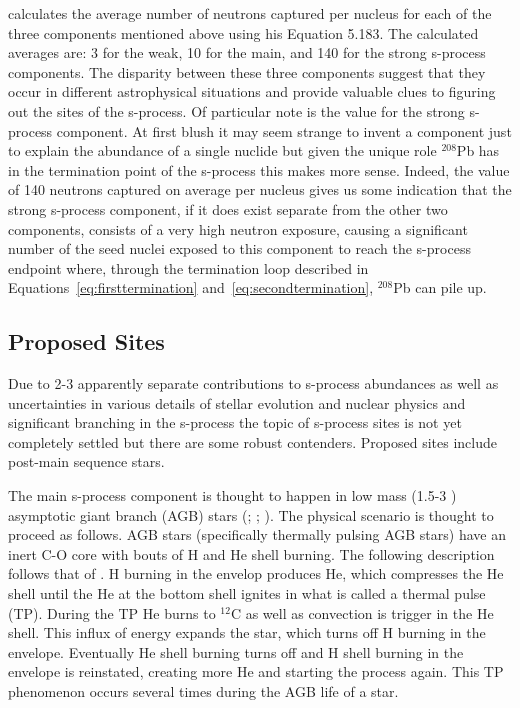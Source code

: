 \cite{iliadis2008} calculates the average number of neutrons captured
per nucleus for each of the three components mentioned above using his
Equation 5.183.  The calculated averages are: 3 for the weak, 10 for
the main, and 140 for the strong s-process components.  The disparity
between these three components suggest that they occur in different
astrophysical situations and provide valuable clues to figuring out
the sites of the s-process.  Of particular note is the value for the
strong s-process component.  At first blush it may seem strange to
invent a component just to explain the abundance of a single nuclide
but given the unique role $^{208}$Pb has in the termination point of
the s-process this makes more sense.  Indeed, the value of 140
neutrons captured on average per nucleus gives us some indication that
the strong s-process component, if it does exist separate from the
other two components, consists of a very high neutron exposure,
causing a significant number of the seed nuclei exposed to this
component to reach the s-process endpoint where, through the
termination loop described in Equations~\ref{eq:firsttermination}
and~\ref{eq:secondtermination}, $^{208}$Pb can pile up.

\subsection{Proposed Sites}

Due to 2-3 apparently separate contributions to s-process abundances
as well as uncertainties in various details of stellar evolution and
nuclear physics and significant branching in the s-process 
the topic of s-process sites is not yet completely
settled but there are some robust contenders.  Proposed
sites include post-main sequence stars.  

The main s-process component is thought to happen in low mass
(1.5-3 \Msol) asymptotic giant branch (AGB) stars
(\citealt{schwarzschild1967}; \citealt{bussoetal1999}; 
\citealt{arlandinietal1999}).
The physical scenario is thought to proceed as follows.  AGB stars
(specifically thermally pulsing AGB stars)
have an inert C-O core with bouts of H and He shell burning.  The
following description follows that of \cite{kappeleretal2011}.  H
burning in the envelop produces He, which compresses the He shell
until the He at the bottom shell ignites in what is called a thermal
pulse (TP).  During the TP He burns to $^{12}$C as well as convection
is trigger in the He shell.  This influx of energy expands the star,
which turns off H burning in the envelope.  Eventually He shell
burning turns off and H shell burning in the envelope is reinstated,
creating more He and starting the process again.  This TP phenomenon 
occurs several times during the AGB life of a star.

